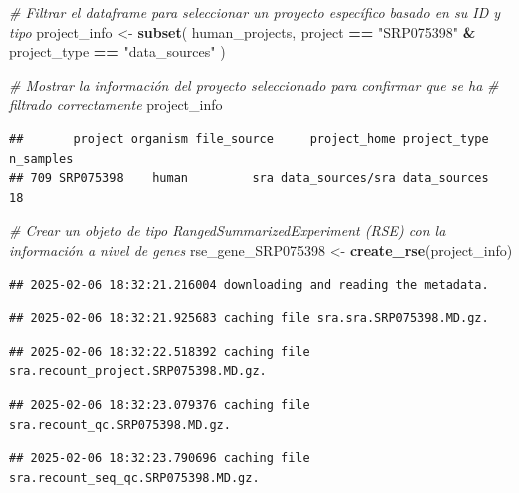\documentclass[
]{article}
\newenvironment{Shaded}{\begin{snugshade}}{\end{snugshade}}
\newcommand{\CommentTok}[1]{\textcolor[rgb]{0.56,0.35,0.01}{\textit{#1}}}
\newcommand{\FunctionTok}[1]{\textcolor[rgb]{0.13,0.29,0.53}{\textbf{#1}}}
\newcommand{\NormalTok}[1]{#1}
\newcommand{\OtherTok}[1]{\textcolor[rgb]{0.56,0.35,0.01}{#1}}
\newcommand{\SpecialCharTok}[1]{\textcolor[rgb]{0.81,0.36,0.00}{\textbf{#1}}}
\newcommand{\StringTok}[1]{\textcolor[rgb]{0.31,0.60,0.02}{#1}}
\begin{document}
\begin{Shaded}
\begin{Highlighting}[]
\CommentTok{\# Filtrar el dataframe para seleccionar un proyecto específico basado en su ID y tipo}
\NormalTok{project\_info }\OtherTok{\textless{}{-}} \FunctionTok{subset}\NormalTok{(}
\NormalTok{  human\_projects,}
\NormalTok{  project }\SpecialCharTok{==} \StringTok{"SRP075398"} \SpecialCharTok{\&}\NormalTok{ project\_type }\SpecialCharTok{==} \StringTok{"data\_sources"}
\NormalTok{)}

\CommentTok{\# Mostrar la información del proyecto seleccionado para confirmar que se ha}
\CommentTok{\# filtrado correctamente}
\NormalTok{project\_info}
\end{Highlighting}
\end{Shaded}

\begin{verbatim}
##       project organism file_source     project_home project_type n_samples
## 709 SRP075398    human         sra data_sources/sra data_sources        18
\end{verbatim}

\begin{Shaded}
\begin{Highlighting}[]
\CommentTok{\# Crear un objeto de tipo RangedSummarizedExperiment (RSE) con la información a nivel de genes}
\NormalTok{rse\_gene\_SRP075398 }\OtherTok{\textless{}{-}} \FunctionTok{create\_rse}\NormalTok{(project\_info)}
\end{Highlighting}
\end{Shaded}

\begin{verbatim}
## 2025-02-06 18:32:21.216004 downloading and reading the metadata.
\end{verbatim}

\begin{verbatim}
## 2025-02-06 18:32:21.925683 caching file sra.sra.SRP075398.MD.gz.
\end{verbatim}

\begin{verbatim}
## 2025-02-06 18:32:22.518392 caching file sra.recount_project.SRP075398.MD.gz.
\end{verbatim}

\begin{verbatim}
## 2025-02-06 18:32:23.079376 caching file sra.recount_qc.SRP075398.MD.gz.
\end{verbatim}

\begin{verbatim}
## 2025-02-06 18:32:23.790696 caching file sra.recount_seq_qc.SRP075398.MD.gz.
\end{verbatim}
\end{document}
